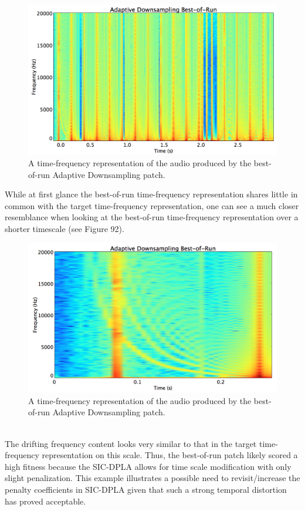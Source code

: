 \documentclass[12pt]{report} 	%
\numberwithin{figure}{chapter}
\numberwithin{table}{chapter}
\numberwithin{equation}{chapter}
\begin{document}
\begin{flushleft}
\begin{figure}[h!]
\begin{center}
\includegraphics[scale=0.33]{AdaptiveDownsamplingBestOfRunSTFT}
\caption[Best-of-run adaptive downsampling time-frequency representation]{A time-frequency representation of the audio produced by the best-of-run Adaptive Downsampling patch.}
\end{center}
\vspace{18pt}
\end{figure}

While at first glance the best-of-run time-frequency representation shares little in common with the target time-frequency representation, one can see a much closer resemblance when looking at the best-of-run time-frequency representation over a shorter timescale (see Figure 92).
\begin{figure}[h!]
\begin{center}
\includegraphics[scale=0.33]{AdaptiveDownsamplingBestOfRunSTFT2}
\caption[Zooming in on the best-of-run adaptive downsampling time-frequency representation]{A time-frequency representation of the audio produced by the best-of-run Adaptive Downsampling patch.}
\end{center}
\end{figure}
\\
The drifting frequency content looks very similar to that in the target time-frequency representation on this scale. Thus, the best-of-run patch likely scored a high fitness because the SIC-DPLA allows for time scale modification with only slight penalization. This example illustrates a possible need to revisit/increase the penalty coefficients in SIC-DPLA given that such a strong temporal distortion has proved acceptable.


\end{flushleft}
\end{document}

